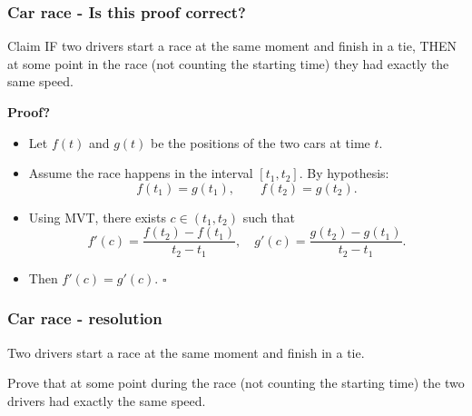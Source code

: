 \begin{frame}[t]
	\fontsize{13}{13}\selectfont
	\frametitle{Car race - Is this proof correct?}

	\begin{block}{\fontsize{13}{13}\selectfont Claim}
		IF two drivers start a race at the same moment and finish in a tie, THEN at
		some point in the race (not counting the starting time) they had exactly the
		same speed.
	\end{block}

	{\bfseries Proof?}
	\begin{itemize}
		\item Let $f(t)$ and $g(t)$ be the positions of the two cars at time $t$.

		\item Assume the race happens in the interval $[t_{1},t_{2}]$. By hypothesis:
			\[
				f(t_{1}) = g(t_{1}), \quad \quad f(t_{2}) = g(t_{2}).
			\]

		\item Using MVT, there exists $c \in (t_{1}, t_{2})$ such that
			\[
				f'(c) = \frac{f(t_{2}) - f(t_{1})}{t_{2}- t_{1}}, \quad g'(c) = \frac{g(t_{2})
				- g(t_{1})}{t_{2}- t_{1}}.
			\]

		\item Then $f'(c) = g'(c)$. \hfill $\square$
	\end{itemize}
\end{frame}

\begin{frame}[t]
	\fontsize{13}{13}\selectfont
	\frametitle{Car race - resolution}

	Two drivers start a race at the same moment and finish in a tie.

	Prove that at some point during the race (not counting the starting time) the two
	drivers had exactly the same speed.
\end{frame}

